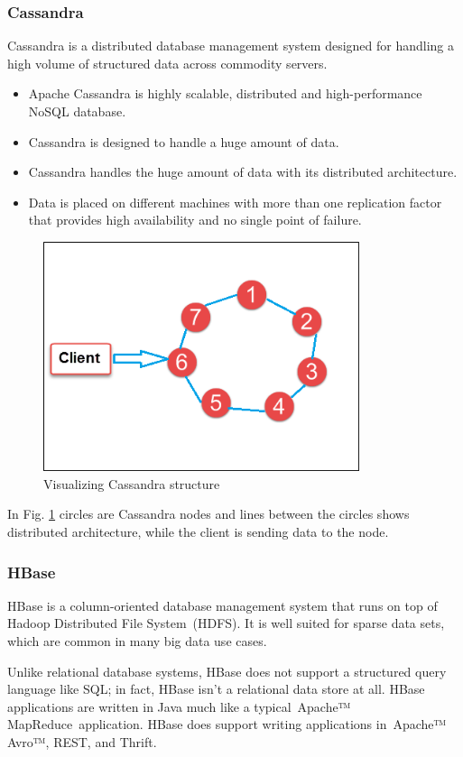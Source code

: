\documentclass[paper=letter, fontsize=12pt]{article}
\begin{document}
	\subsubsection{Cassandra}
	Cassandra is a distributed database management system designed for handling a high volume of structured data across commodity servers. 
	\begin{itemize}
		\item Apache Cassandra is highly scalable, distributed and high-performance NoSQL database. 
		\item Cassandra is designed to handle a huge amount of data.
		\item Cassandra handles the huge amount of data with its distributed architecture.
		\item Data is placed on different machines with more than one replication factor that provides high availability and no single point of failure.
	\end{itemize}
	\begin{figure}[H]
		\centering
		\includegraphics[width=350px]{refs/cassandra.jpg}
		\caption{Visualizing Cassandra structure}\label{cassandra}
	\end{figure}
	In Fig. \ref{cassandra} circles are Cassandra nodes and lines between the circles shows distributed architecture, while the client is sending data to the node.
	
	\subsubsection{HBase}
	HBase is a column-oriented database management system that runs on top of Hadoop Distributed File System (HDFS). It is well suited for sparse data sets, which are common in many big data use cases. 

	Unlike relational database systems, HBase does not support a structured query language like SQL; in fact, HBase isn’t a relational data store at all. HBase applications are written in Java much like a typical Apache™ MapReduce application. HBase does support writing applications in Apache™ Avro™, REST, and Thrift.
	
\end{document}
